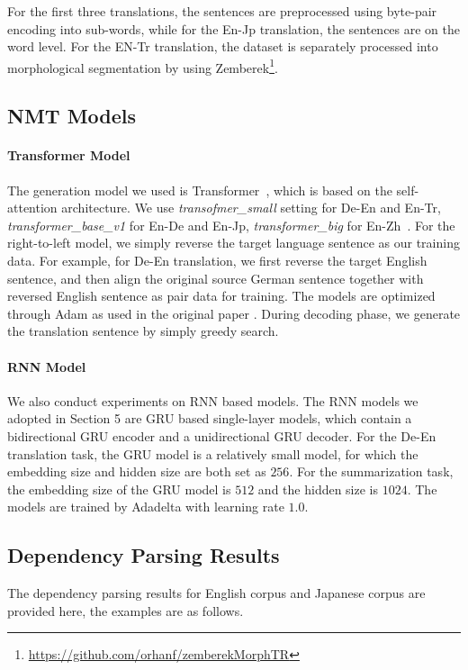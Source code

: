 \documentclass[11pt,a4paper]{article}
\begin{document}
For the first three translations, the sentences are preprocessed using byte-pair encoding \cite{DBLP:conf/acl/SennrichHB16a} into sub-words, while for the En-Jp translation, the sentences are on the word level. For the EN-Tr translation, the dataset is separately processed into morphological segmentation by using Zemberek\footnote{\url{https://github.com/orhanf/zemberekMorphTR}}.

\subsection{NMT Models}
\paragraph{Transformer Model} The generation model we used is Transformer~\cite{DBLP:conf/nips/VaswaniSPUJGKP17}, which is based on the self-attention architecture. We use \emph{transofmer\_small} setting for De-En and En-Tr, \emph{transformer\_base\_v1} for En-De and En-Jp, \emph{transformer\_big} for En-Zh~\cite{DBLP:journals/corr/abs-1803-07416}. For the right-to-left model, we simply reverse the target language sentence as our training data. For example, for De-En translation, we first reverse the target English sentence, and then align the original source German sentence together with reversed English sentence as pair data for training. The models are optimized through Adam as used in the original paper \cite{DBLP:conf/nips/VaswaniSPUJGKP17}. During decoding phase, we generate the translation sentence by simply greedy search.

\paragraph{RNN Model} We also conduct experiments on RNN based models. The RNN models we adopted in Section 5 are GRU based single-layer models, which contain a bidirectional GRU encoder and a unidirectional GRU decoder. For the De-En translation task, the GRU model is a relatively small model, for which the embedding size and hidden size are both set as $256$. For the summarization task, the embedding size of the GRU model is $512$ and the hidden size is $1024$. The models are trained by Adadelta with learning rate $1.0$.

\subsection{Dependency Parsing Results}
The dependency parsing results for English corpus and Japanese corpus are provided here, the examples are as follows.
\end{document}
